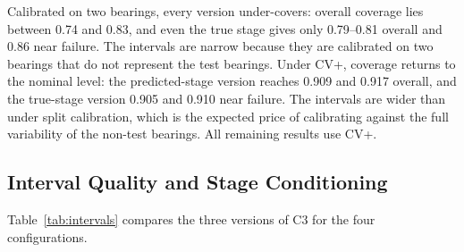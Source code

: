 \documentclass[review]{elsarticle}
\begin{document}
Calibrated on two bearings, every version under-covers: overall
coverage lies between 0.74 and 0.83, and even the true stage gives only
0.79--0.81 overall and 0.86 near failure. The intervals are narrow
because they are calibrated on two bearings that do not represent the
test bearings. Under CV+, coverage returns to the nominal level: the
predicted-stage version reaches 0.909 and 0.917 overall, and the
true-stage version 0.905 and 0.910 near failure. The intervals are
wider than under split calibration, which is the expected price of
calibrating against the full variability of the non-test bearings.
All remaining results use CV+.

\subsection{Interval Quality and Stage Conditioning}
\label{sec:res_intervals}

Table~\ref{tab:intervals} compares the three versions of C3 for the
four configurations.
\end{document}
